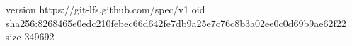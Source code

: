 version https://git-lfs.github.com/spec/v1
oid sha256:8268465e0edc210febec66d642fe7db9a25e7c76c8b3a02ee0c0d69b9ae62f22
size 349692

